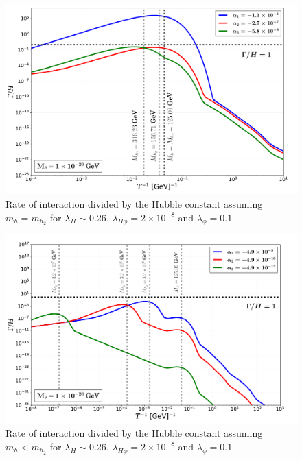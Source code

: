 \begin{frame}
    \begin{figure}
         \centering \includegraphics[width=.8\textwidth]{Figures/ratedm_equal.pdf}
        \caption{Rate of interaction divided by the Hubble constant assuming $m_h = m_{h_2}$ for $\lambda_H\sim0.26$, $\lambda_{H\phi}=2\times10^{-8}$ and $\lambda_\phi=0.1$}
        \label{fig:rot}
    \end{figure}
\end{frame}
\begin{frame}
        \begin{figure}
         \centering
         \includegraphics[width=.8\textwidth]{Figures/ratedm_greater.pdf}
        \caption{Rate of interaction divided by the Hubble constant assuming $m_h < m_{h_2}$ for $\lambda_H\sim0.26$, $\lambda_{H\phi}=2\times10^{-8}$ and $\lambda_\phi=0.1$}
        \label{fig:rot}
    \end{figure}
\end{frame}
